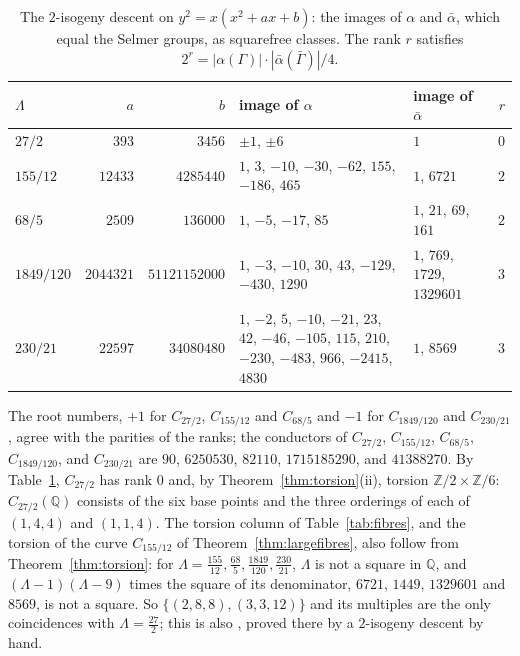 \documentclass[10pt]{article}
\newcommand{\Q}{\mathbb{Q}}
\newcommand{\Z}{\mathbb{Z}}
\begin{document}
\begin{table}[t]
\centering\footnotesize\setlength{\tabcolsep}{4pt}
\begin{tabular}{@{}lrr>{\raggedright\arraybackslash}p{}>{\raggedright\arraybackslash}p{}r@{}}
\toprule
$\Lambda$ & $a$ & $b$ & image of $\alpha$ & image of $\bar\alpha$ & $r$\\
\midrule
$27/2$ & $393$ & $3456$ & $\pm1$, $\pm6$ & $1$ & $0$\\
$155/12$ & $12433$ & $4285440$ & $1$, $3$, $-10$, $-30$, $-62$, $155$, $-186$, $465$ & $1$, $6721$ & $2$\\
$68/5$ & $2509$ & $136000$ & $1$, $-5$, $-17$, $85$ & $1$, $21$, $69$, $161$ & $2$\\
$1849/120$ & $2044321$ & $51121152000$ & $1$, $-3$, $-10$, $30$, $43$, $-129$, $-430$, $1290$ & $1$, $769$, $1729$, $1329601$ & $3$\\
$230/21$ & $22597$ & $34080480$ & $1$, $-2$, $5$, $-10$, $-21$, $23$, $42$, $-46$, $-105$, $115$, $210$, $-230$, $-483$, $966$, $-2415$, $4830$ & $1$, $8569$ & $3$\\
\bottomrule
\end{tabular}
\caption{The $2$-isogeny descent on $y^2=x(x^2+ax+b)$: the images of $\alpha$ and $\bar\alpha$, which equal the Selmer groups, as squarefree classes. The rank $r$ satisfies $2^r=|\alpha(\Gamma)|\cdot|\bar\alpha(\bar\Gamma)|/4$.}\label{tab:selmer}
\end{table}

 The root numbers, $+1$ for $C_{27/2}$, $C_{155/12}$ and $C_{68/5}$ and $-1$ for $C_{1849/120}$ and $C_{230/21}$, agree with the parities of the ranks; the conductors of $C_{27/2}$, $C_{155/12}$, $C_{68/5}$, $C_{1849/120}$, and $C_{230/21}$ are $90$, $6250530$, $82110$, $1715185290$, and $41388270$. By Table~\ref{tab:selmer}, $C_{27/2}$ has rank $0$ and, by Theorem~\ref{thm:torsion}(ii), torsion $\Z/2\times\Z/6$: $C_{27/2}(\Q)$ consists of the six base points and the three orderings of each of $(1,4,4)$ and $(1,1,4)$. The torsion column of Table~\ref{tab:fibres}, and the torsion of the curve $C_{155/12}$ of Theorem~\ref{thm:largefibres}, also follow from Theorem~\ref{thm:torsion}: for $\Lambda=\frac{155}{12},\frac{68}5,\frac{1849}{120},\frac{230}{21}$, $\Lambda$ is not a square in $\Q$, and $(\Lambda-1)(\Lambda-9)$ times the square of its denominator, $6721$, $1449$, $1329601$ and $8569$, is not a square. So $\{(2,8,8),(3,3,12)\}$ and its multiples are the only coincidences with $\Lambda=\frac{27}2$; this is also \cite[Theorem~5.11]{gangetal-heat}, proved there by a $2$-isogeny descent by hand.
\end{document}
